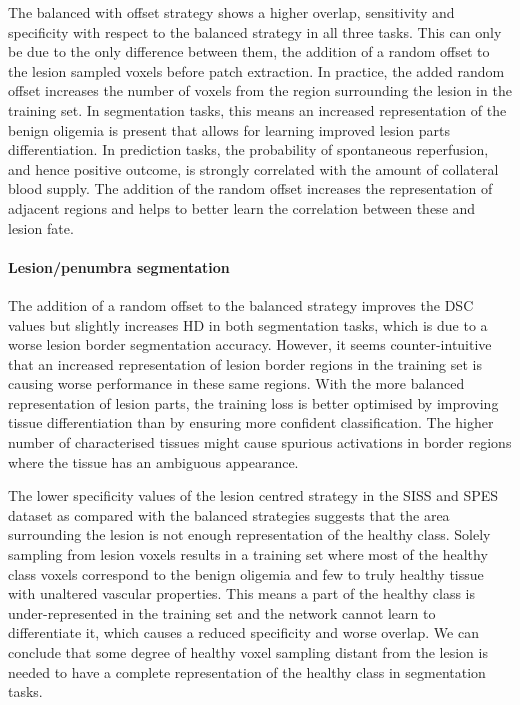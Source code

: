 \documentclass[letterpaper,final,authoryear,3p,times,twocolumn]{elsarticle}
\begin{document}
The balanced with offset strategy shows a higher overlap, sensitivity and specificity with respect to the balanced strategy in all three tasks. This can only be due to the only difference between them, the addition of a random offset to the lesion sampled voxels before patch extraction. In practice, the added random offset increases the number of voxels from the region surrounding the lesion in the training set. In segmentation tasks, this means an increased representation of the benign oligemia is present that allows for learning improved lesion parts differentiation. In prediction tasks, the probability of spontaneous reperfusion, and hence positive outcome, is strongly correlated with the amount of collateral blood supply. The addition of the random offset increases the representation of adjacent regions and helps to better learn the correlation between these and lesion fate.

\paragraph{Lesion/penumbra segmentation} 
The addition of a random offset to the balanced strategy improves the DSC values but slightly increases HD in both segmentation tasks, which is due to a worse lesion border segmentation accuracy. However, it seems counter-intuitive that an increased representation of lesion border regions in the training set is causing worse performance in these same regions. With the more balanced representation of lesion parts, the training loss is better optimised by improving tissue differentiation than by ensuring more confident classification. The higher number of characterised tissues might cause spurious activations in border regions where the tissue has an ambiguous appearance. 

The lower specificity values of the lesion centred strategy in the SISS and SPES dataset as compared with the balanced strategies suggests that the area surrounding the lesion is not enough representation of the healthy class. Solely sampling from lesion voxels results in a training set where most of the healthy class voxels correspond to the benign oligemia and few to truly healthy tissue with unaltered vascular properties. This means a part of the healthy class is under-represented in the training set and the network cannot learn to differentiate it, which causes a reduced specificity and worse overlap. We can conclude that some degree of healthy voxel sampling distant from the lesion is needed to have a complete representation of the healthy class in segmentation tasks.
\end{document}
